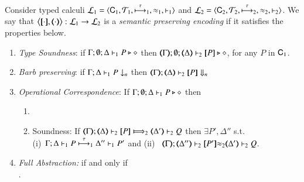 \begin{definition}\rm
\label{def:ep}
       Consider typed calculi
        $\tyl{L}_1=\calc{\CAL_1}{{\cal{T}}_1}{\hby{\tau}_1}{\wb_1}{\proves_1}$
       and $\tyl{L}_2=\calc{\CAL_2}{{\cal{T}}_2}{\hby{\tau}_2}{\wb_2}{\proves_2}$.
We say that $\enco{\map{\cdot}, \mapt{\cdot}}: \tyl{L}_1 \to \tyl{L}_2$ is a \emph{semantic preserving encoding}
if it satisfies the properties below.
	
	\begin{enumerate}[1.]
		\item \emph{Type Soundness}:
	if
	$\Gamma; \emptyset; \Delta \proves_1 P \hastype \Proc$ then 
	$\mapt{\Gamma}; \emptyset; \mapt{\Delta} \proves_2 \map{P} \hastype \Proc$,  
	for any   $P$ in $\CAL_1$.

			\item \emph{Barb preserving}: if $\Gamma; \Delta \proves_1 P \barb{n}$
		then $\mapt{\Gamma}; \mapt{\Delta} \proves_2 \map{P} \Barb{n}$

	\item \emph{Operational Correspondence}: If $\Gamma; \emptyset; \Delta \proves_1 P \hastype \Proc$ then
		\begin{enumerate}
			\item	{}
				
			\item	Soundness:   
				If  $\wtytraargi{\mapt{\Gamma}}{}{\mapt{\Delta}}{\map{P}}{\mapt{\Delta'}}{Q}{2}{2}$
				then  $\exists P', \Delta''$ s.t.  \\
				(i)~$\stytraargi{\Gamma}{\tau}{\Delta}{P}{\Delta''}{P'}{1}{1}$
				and 
				(ii)~
${\mapt{\Gamma}};{\mapt{\Delta''}}\proves_2 {\map{P'}}{\wb_2}
{\mapt{\Delta'}}\proves_2 {Q}$.

		\end{enumerate}
		
		\item \emph{Full Abstraction:} 
		if and only if \\
		.
		
	\end{enumerate}
\end{definition}

